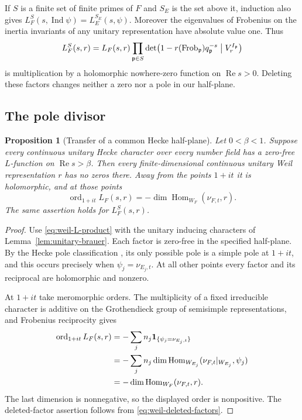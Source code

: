 \documentclass[11pt,a4paper]{article}
\numberwithin{equation}{section}
\newtheorem{proposition}[theorem]{Proposition}
\theoremstyle{definition}
\theoremstyle{remark}
\newcommand{\Rea}{\operatorname{Re}}
\newcommand{\ind}{\mathbf 1}
\begin{document}
If $S$ is a finite set of finite primes of $F$ and $S_E$ is the set
above it, induction also gives
$L_F^S(s,\operatorname{Ind}\psi)=L_E^{S_E}(s,\psi)$.
Moreover the eigenvalues of Frobenius on the inertia invariants of
any unitary representation have absolute value one.  Thus
\begin{equation}\label{eq:weil-deleted-factors}
 L_F^S(s,r)=L_F(s,r)\prod_{\mathfrak p\in S}
 \det\!\left(1-r(\operatorname{Frob}_{\mathfrak p})
 q_{\mathfrak p}^{-s}\bigm|V_r^{I_{\mathfrak p}}\right)
\end{equation}
is multiplication by a holomorphic nowhere-zero function on
$\Rea s>0$.  Deleting these factors changes neither a zero nor a
pole in our half-plane.

\subsection{The pole divisor}\label{subsec:weil-divisor}

\begin{proposition}[Transfer of a common Hecke half-plane]
\label{prop:weil-halfplane-transfer}
Let $0<\beta<1$.  Suppose every continuous unitary Hecke character
over every number field has a zero-free $L$-function on
$\Rea s>\beta$.  Then every finite-dimensional continuous unitary
Weil representation $r$ has no zeros there.  Away from the points
$1+it$ it is holomorphic, and at those points
\[
 \operatorname{ord}_{1+it}L_F(s,r)
    =-\dim\operatorname{Hom}_{W_F}(\nu_{F,t},r).
\]
The same assertion holds for $L_F^S(s,r)$.
\end{proposition}
\begin{proof}
Use \eqref{eq:weil-L-product} with the unitary inducing characters of
Lemma~\ref{lem:unitary-brauer}.  Each factor is zero-free in the
specified half-plane.  By the Hecke pole classification
\cite{Tate}, its only possible pole is a simple pole at $1+it$,
and this occurs precisely when $\psi_j=\nu_{E_j,t}$.
At all other points every factor and its reciprocal are holomorphic
and nonzero.

At $1+it$ take meromorphic orders.  The multiplicity of a fixed
irreducible character is additive on the Grothendieck group of
semisimple representations, and Frobenius reciprocity gives
\begin{align}
 \operatorname{ord}_{1+it}L_F(s,r)
 &=-\sum_j n_j\ind_{\{\psi_j=\nu_{E_j,t}\}} \notag\\
 &=-\sum_j n_j\dim\operatorname{Hom}_{W_{E_j}}
        (\nu_{F,t}|_{W_{E_j}},\psi_j) \notag\\
 &=-\dim\operatorname{Hom}_{W_F}(\nu_{F,t},r).
 \label{eq:weil-Frobenius-order}
\end{align}
The last dimension is nonnegative, so the displayed order is nonpositive.  The deleted-factor assertion follows from
\eqref{eq:weil-deleted-factors}.
\end{proof}
\end{document}
